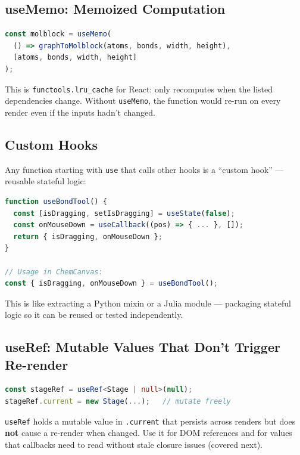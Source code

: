 \documentclass[11pt,a4paper]{article}
\begin{document}
\subsection{useMemo: Memoized Computation}

\begin{lstlisting}[language=TypeScript]
const molblock = useMemo(
  () => graphToMolblock(atoms, bonds, width, height),
  [atoms, bonds, width, height]
);
\end{lstlisting}

This is \texttt{functools.lru\_cache} for React: only recomputes when the listed
dependencies change. Without \lstinline|useMemo|, the function would re-run on every
render even if the inputs hadn't changed.

\subsection{Custom Hooks}

Any function starting with \lstinline|use| that calls other hooks is a ``custom hook''
--- reusable stateful logic:

\begin{lstlisting}[language=TypeScript]
function useBondTool() {
  const [isDragging, setIsDragging] = useState(false);
  const onMouseDown = useCallback((pos) => { ... }, []);
  return { isDragging, onMouseDown };
}

// Usage in ChemCanvas:
const { isDragging, onMouseDown } = useBondTool();
\end{lstlisting}

This is like extracting a Python mixin or a Julia module --- packaging stateful logic
so it can be reused or tested independently.

\subsection{useRef: Mutable Values That Don't Trigger Re-render}

\begin{lstlisting}[language=TypeScript]
const stageRef = useRef<Stage | null>(null);
stageRef.current = new Stage(...);   // mutate freely
\end{lstlisting}

\lstinline|useRef| holds a mutable value in \lstinline|.current| that persists across
renders but does \textbf{not} cause a re-render when changed. Use it for DOM references
and for values that callbacks need to read without stale closure issues (covered next).
\end{document}
